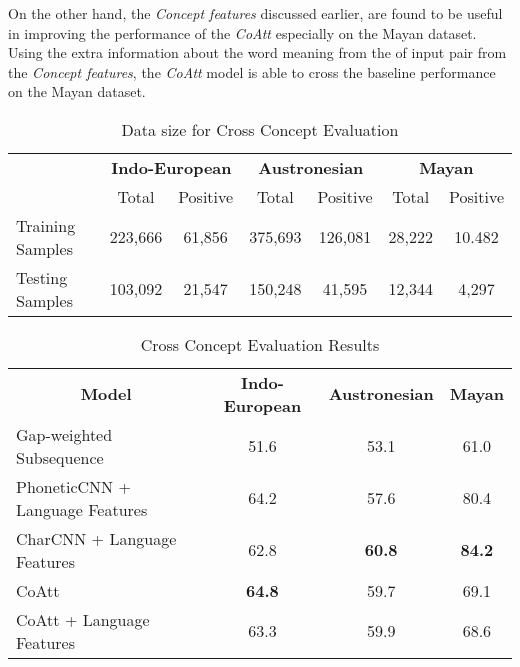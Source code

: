 \documentclass[11pt,letterpaper]{article}
\begin{document}
On the other hand, the \textit{Concept features} discussed earlier, are found to be useful in improving the performance of the \textit{CoAtt} especially on the Mayan dataset. Using the extra information about the word meaning from the of input pair from the \textit{Concept features}, the \textit{CoAtt} model is able to cross the baseline performance on the Mayan dataset.

\begin{table*}[t]
\centering
\begin{tabular}{lcccccc}
\multicolumn{1}{c}{\textbf{}} & \multicolumn{2}{c}{\textbf{Indo-European}} & \multicolumn{2}{c}{\textbf{Austronesian}} & \multicolumn{2}{c}{\textbf{Mayan}} \\
\multicolumn{1}{c}{}          & Total               & Positive             & Total               & Positive            & Total           & Positive         \\
Training Samples              & 223,666             & 61,856               & 375,693             & 126,081             & 28,222          & 10.482           \\
Testing Samples               & 103,092             & 21,547               & 150,248             & 41,595              & 12,344          & 4,297           
\end{tabular}
\caption{Data size for Cross Concept Evaluation}
\label{CC_count}
\end{table*}

\begin{table*}[t]
\centering
\begin{tabular}{lccc}
\multicolumn{1}{c}{\textbf{Model}} & \textbf{Indo-European} & \textbf{Austronesian} & \textbf{Mayan} \\
Gap-weighted Subsequence           & 51.6                   & 53.1                  & 61.0           \\
PhoneticCNN + Language Features                 & 64.2                   & 57.6                  & 80.4           \\
CharCNN + Language Features                     & 62.8                   & \textbf{60.8}                  & \textbf{84.2}           \\ \hline
CoAtt                              & \textbf{64.8}                   & 59.7                  & 69.1           \\
CoAtt + Language Features                       & 63.3                   & 59.9                  & 68.6          
\end{tabular}
\label{CC_res}
\caption{Cross Concept Evaluation Results}
\end{table*}
\end{document}
